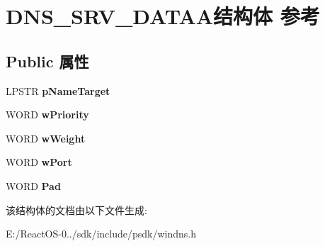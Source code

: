 \hypertarget{struct_d_n_s___s_r_v___d_a_t_a_a}{}\section{D\+N\+S\+\_\+\+S\+R\+V\+\_\+\+D\+A\+T\+A\+A结构体 参考}
\label{struct_d_n_s___s_r_v___d_a_t_a_a}
\subsection*{Public 属性}
\begin{DoxyCompactItemize}
\item 
\mbox{\label{struct_d_n_s___s_r_v___d_a_t_a_a_aed69b8f9069cf3ab389431293558fa68}} 
L\+P\+S\+TR {\bfseries p\+Name\+Target}
\item 
\mbox{\label{struct_d_n_s___s_r_v___d_a_t_a_a_acae673ac5ad17a38e3b17e8700882755}} 
W\+O\+RD {\bfseries w\+Priority}
\item 
\mbox{\label{struct_d_n_s___s_r_v___d_a_t_a_a_a4795da59365120eafc1905623c301ba5}} 
W\+O\+RD {\bfseries w\+Weight}
\item 
\mbox{\label{struct_d_n_s___s_r_v___d_a_t_a_a_a820909003308746075b8eec5ad45a7b0}} 
W\+O\+RD {\bfseries w\+Port}
\item 
\mbox{\label{struct_d_n_s___s_r_v___d_a_t_a_a_afb0fd1703894579a587ecaf9076046cb}} 
W\+O\+RD {\bfseries Pad}
\end{DoxyCompactItemize}


该结构体的文档由以下文件生成\+:\begin{DoxyCompactItemize}
\item 
E\+:/\+React\+O\+S-\/0../sdk/include/psdk/windns.\+h\end{DoxyCompactItemize}
